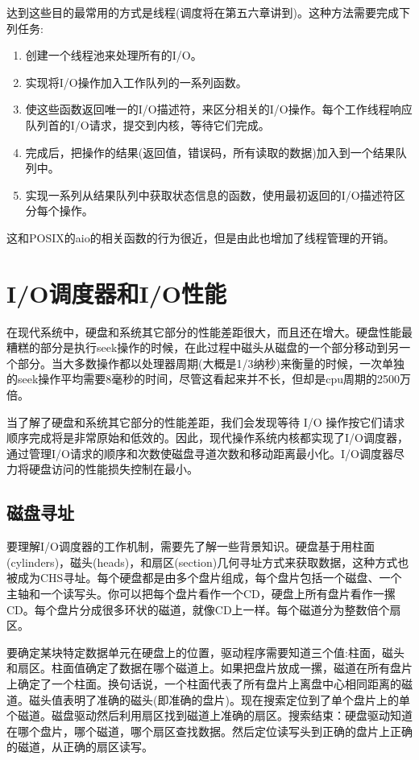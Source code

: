 达到这些目的最常用的方式是线程(调度将在第五六章讲到)。这种方法需要完成下列任务:

\begin{enumerate}
\item 创建一个线程池来处理所有的I/O。
\item 实现将I/O操作加入工作队列的一系列函数。
\item 使这些函数返回唯一的I/O描述符，来区分相关的I/O操作。每个工作线程响应队列首的I/O请求，提交到内核，等待它们完成。
\item 完成后，把操作的结果(返回值，错误码，所有读取的数据)加入到一个结果队列中。
\item 实现一系列从结果队列中获取状态信息的函数，使用最初返回的I/O描述符区分每个操作。
\end{enumerate}

这和POSIX的aio的相关函数的行为很近，但是由此也增加了线程管理的开销。

\section{I/O调度器和I/O性能}

在现代系统中，硬盘和系统其它部分的性能差距很大，而且还在增大。硬盘性能最糟糕的部分是执行seek操作的时候，在此过程中磁头从磁盘的一个部分移动到另一个部分。当大多数操作都以处理器周期(大概是1/3纳秒)来衡量的时候，一次单独的seek操作平均需要8毫秒的时间，尽管这看起来并不长，但却是cpu周期的2500万倍。

当了解了硬盘和系统其它部分的性能差距，我们会发现等待 I/O 操作按它们请求顺序完成将是非常原始和低效的。因此，现代操作系统内核都实现了I/O调度器，通过管理I/O请求的顺序和次数使磁盘寻道次数和移动距离最小化。I/O调度器尽力将硬盘访问的性能损失控制在最小。

\subsection{磁盘寻址}

要理解I/O调度器的工作机制，需要先了解一些背景知识。硬盘基于用柱面(cylinders)，磁头(heads)，和扇区(section)几何寻址方式来获取数据，这种方式也被成为CHS寻址。每个硬盘都是由多个盘片组成，每个盘片包括一个磁盘、一个主轴和一个读写头。你可以把每个盘片看作一个CD，硬盘上所有盘片看作一摞CD。每个盘片分成很多环状的磁道，就像CD上一样。每个磁道分为整数倍个扇区。

要确定某块特定数据单元在硬盘上的位置，驱动程序需要知道三个值:柱面，磁头和扇区。柱面值确定了数据在哪个磁道上。如果把盘片放成一摞，磁道在所有盘片上确定了一个柱面。换句话说，一个柱面代表了所有盘片上离盘中心相同距离的磁道。磁头值表明了准确的磁头(即准确的盘片)。现在搜索定位到了单个盘片上的单个磁道。磁盘驱动然后利用扇区找到磁道上准确的扇区。搜索结束：硬盘驱动知道在哪个盘片，哪个磁道，哪个扇区查找数据。然后定位读写头到正确的盘片上正确的磁道，从正确的扇区读写。
     
